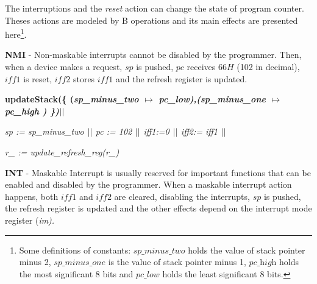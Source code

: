 \documentclass[a4paper]{llncs}
\begin{document}
The interruptions and the \textit{reset} action can change the state of program
counter. Theses actions are modeled by B operations and its main effects are
presented here\footnote{Some definitions of constants: $\textit{sp\_minus\_two}$
holds the value of stack pointer minus 2,
 $\textit{sp\_minus\_one}$ is the value of stack pointer minus 1,
$\textit{pc\_high}$ holds the most significant 8 bits and $\textit{pc\_low}$
holds the least significant 8 bits.}.


 \textbf{NMI} - Non-maskable interrupts cannot be disabled
 by the programmer. Then, when a device makes a request, $sp$ is pushed,
 $pc$ receives $66H$ (102 in decimal), $\textit{iff1}$ is reset, $\textit{iff2}$ stores
 $\textit{iff1}$ and the refresh register is updated.
  
\begin{sloppypar}
\bf updateStack\rm (\rm \{ \rm (\it sp\_minus\_two  $\mapsto$  \it pc\_low\rm )\rm ,\rm (\it sp\_minus\_one  $\mapsto$ \it pc\_high \rm ) \rm \}\rm )$\mbox{$\mid\mid$}$

\it sp \rm := \it sp\_minus\_two  $\mbox{$\mid\mid$}$ \it pc \rm := \rm 1\rm 0\rm 2 $\mbox{$\mid\mid$}$ \it iff1\rm :=\rm 0  $\mbox{$\mid\mid$}$  \it iff2\rm := \it iff1 $\mbox{$\mid\mid$}$

\it r\_ \rm := \it update\_refresh\_reg\rm (\it r\_\rm )\\
\end{sloppypar}

  \textbf{INT} - Maskable Interrupt is usually reserved for important functions
  that can be enabled and disabled by the programmer. When a maskable interrupt
  action happens, both $\textit{iff1}$ and $\textit{iff2}$ are cleared,
  disabling the interrupts, $sp$ is pushed, the refresh register is updated and
  the other effects depend on the interrupt mode register (\it im\rm).
 
\end{document}
